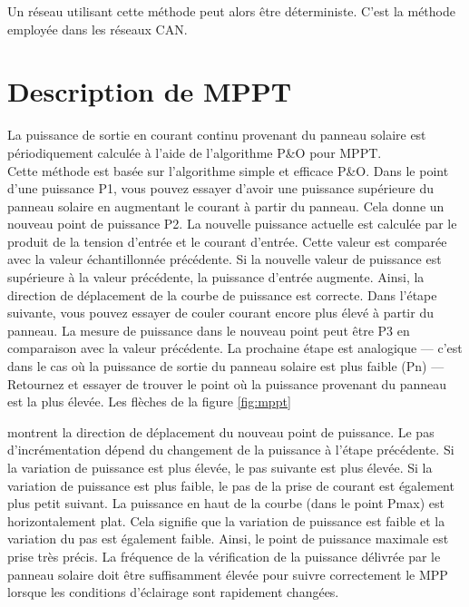 \documentclass[11pt, a4paper, twoside]{book}
\begin{document}
{Un réseau utilisant cette méthode peut alors être déterministe. C'est la méthode employée dans les réseaux CAN.

\chapter{Description de MPPT}
\label{apdx:MPPT}
La puissance de sortie en courant continu provenant du panneau solaire est périodiquement calculée à l'aide de l'algorithme P\&O pour MPPT.\\

Cette méthode est basée sur l'algorithme simple et efficace P\&O. Dans le point d'une puissance P1, vous pouvez essayer d'avoir une puissance supérieure du panneau solaire en augmentant le courant à partir du panneau. Cela donne un nouveau point de puissance P2.
La nouvelle puissance actuelle est calculée par le produit de la tension d'entrée et le courant d'entrée. Cette valeur est comparée avec la valeur échantillonnée précédente.
Si la nouvelle valeur de puissance est supérieure à la valeur précédente, la puissance d'entrée augmente. Ainsi, la direction de déplacement de la courbe de puissance est correcte.
Dans l'étape suivante, vous pouvez essayer de couler courant encore plus élevé à partir du panneau. La mesure de puissance dans le nouveau point peut être P3 en comparaison avec la valeur précédente.
La prochaine étape est analogique — c'est dans le cas où la puissance de sortie du panneau solaire est plus faible (Pn) — Retournez et essayer de trouver le point où la puissance provenant du panneau est la plus élevée.
Les flèches de la figure \ref{fig:mppt}} montrent la direction de déplacement du nouveau point de puissance. Le pas d'incrémentation dépend du changement de la puissance à l'étape précédente. Si la variation de puissance est plus élevée, le pas suivante est plus élevée. Si la variation de puissance est plus faible, le pas de la prise de courant est également plus petit suivant.
La puissance en haut de la courbe (dans le point Pmax) est horizontalement plat. Cela signifie que la variation de puissance est faible et la variation du pas est également faible. Ainsi, le point de puissance maximale est prise très précis. La fréquence de la vérification de la puissance délivrée par le panneau solaire doit être suffisamment élevée pour suivre correctement le MPP lorsque les conditions d'éclairage sont rapidement changées.
\end{document}
